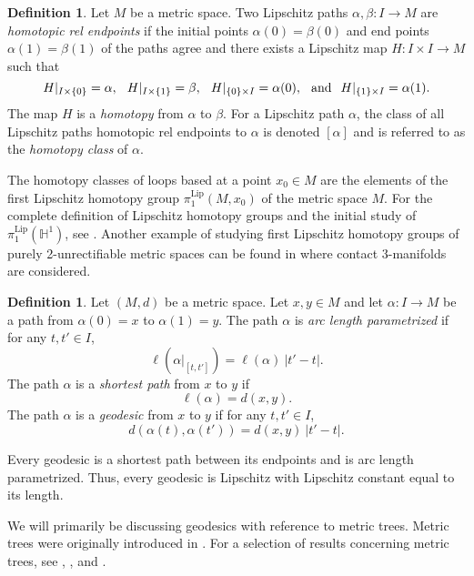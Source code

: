 \documentclass{article}
\theoremstyle{definition}
\newtheorem{definition}[theorem]{Definition}
\theoremstyle{remark}
\def\H{\mathbb{H}}
\def\H{\mathbb{H}}
\newcommand{\pilip}[1]{\pi_{#1}^{\text{Lip}}}
\newcommand{\length}[1]{\ell}%
\begin{document}
\begin{definition}\label{path classes}
Let $M$ be a metric space. Two Lipschitz paths $\alpha,\beta:I\longrightarrow M$ are \emph{homotopic rel endpoints} if the initial points $\alpha(0)=\beta(0)$ and end points $\alpha(1)=\beta(1)$ of the paths agree and there exists a Lipschitz map $H:I\times I\rightarrow M$ such that
\[
H|_{I\times\{0\}}=\alpha,\hspace{.25cm} H|_{I\times\{1\}}=\beta,\hspace{.25cm} H|_{\{0\}\times I}=\alpha(0),\hspace{.25cm}\text{and}\hspace{.25cm} H|_{\{1\}\times I}=\alpha(1).
\]
The map $H$ is a \emph{homotopy} from $\alpha$ to $\beta$. For a Lipschitz path $\alpha$, the class of all Lipschitz paths homotopic rel endpoints to $\alpha$ is denoted $[\alpha]$ and is referred to as the \emph{homotopy class} of $\alpha$. %
\end{definition}

The homotopy classes of loops based at a point $x_0\in M$ are the elements of the first Lipschitz homotopy group $\pilip{1}(M,x_0)$ of the metric space $M$. For the complete definition of Lipschitz homotopy groups and the initial study of $\pilip{1}(\H^1)$, see \cite{Dej}. Another example of studying first Lipschitz homotopy groups of purely 2-unrectifiable metric spaces can be found in \cite{perry2020lipschitz} where contact 3-manifolds are considered. 

\begin{definition}\label{geodesic definition}
Let $(M,d)$ be a metric space. Let $x,y\in M$ and let $\alpha: I\rightarrow M$ be a path from $\alpha(0)=x$ to $\alpha(1)=y$. The path $\alpha$ is \emph{arc length parametrized} if for any $t,t'\in I$,
\[
\length{M}\left(\left.\alpha\right|_{[t,t']}\right)=\length{M}(\alpha)~|t'-t|.
\]
The path $\alpha$ is a \emph{shortest path} from $x$ to $y$ if 
\[
\length{M}(\alpha)=d(x,y).
\]
The path $\alpha$ is a \emph{geodesic} from $x$ to $y$ if for any $t,t'\in I$,
\[
d(\alpha(t),\alpha(t'))=d(x,y)~|t'-t|.
\]
\end{definition}

Every geodesic is a shortest path between its endpoints and is arc length parametrized. %
Thus, every geodesic is Lipschitz with Lipschitz constant equal to its length.

We will primarily be discussing geodesics with reference to metric trees.  Metric trees were originally introduced in \cite{tits1977theorem}. For a selection of results concerning metric trees, see \cite{aksoy2006selection}, \cite{aksoy2010some}, and \cite{mayer1992universal}.
\end{document}
